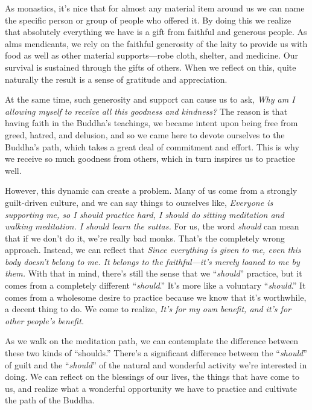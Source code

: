 As monastics, it's nice that for almost any material item around us we 
can name the specific person or group of people who offered it. By 
doing this we realize that absolutely everything we have is a gift from 
faithful and generous people. As alms mendicants, we rely on the 
faithful generosity of the laity to provide us with food as well as 
other material supports---robe cloth, shelter, and medicine. Our 
survival is sustained through the gifts of others. When we reflect on 
this, quite naturally the result is a sense of gratitude and 
appreciation.

At the same time, such generosity and support can cause us to ask, 
\emph{Why am I allowing myself to receive all this goodness and 
kindness?} The reason is that having faith in the Buddha's teachings, 
we became intent upon being free from greed, hatred, and delusion, and 
so we came here to devote ourselves to the Buddha's path, which takes a 
great deal of commitment and effort. This is why we receive so much 
goodness from others, which in turn inspires us to practice well.

However, this dynamic can create a problem. Many of us come from a 
strongly guilt-driven culture, and we can say things to ourselves like, 
\emph{Everyone is supporting me, so I should practice hard, I should do 
sitting meditation and walking meditation. I should learn the suttas.} 
For us, the word \emph{should} can mean that if we don't do it, we're 
really bad monks. That's the completely wrong approach. Instead, we can 
reflect that \emph{Since everything is given to me, even this body 
doesn't belong to me. It belongs to the faithful---it's merely loaned 
to me by them.} With that in mind, there's still the sense that we 
``\emph{should}'' practice, but it comes from a completely different 
``\emph{should}.'' It's more like a voluntary ``\emph{should}.'' It 
comes from a wholesome desire to practice because we know that it's 
worthwhile, a decent thing to do. We come to realize, \emph{It's for my 
own benefit, and it's for other people's benefit.}

As we walk on the meditation path, we can contemplate the difference 
between these two kinds of ``shoulds.'' There's a significant 
difference between the ``\emph{should}'' of guilt and the 
``\emph{should}'' of the natural and wonderful activity we're 
interested in doing. We can reflect on the blessings of our lives, the 
things that have come to us, and realize what a wonderful opportunity 
we have to practice and cultivate the path of the Buddha.

